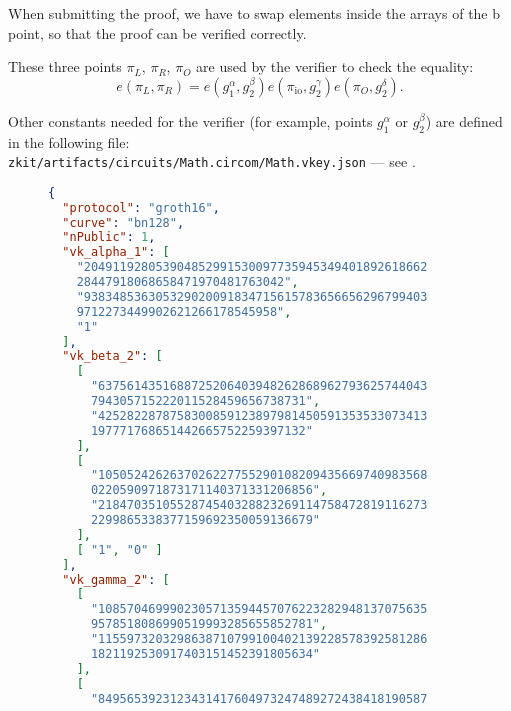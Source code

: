 \documentclass[../lecture-notes.tex]{subfiles}
\begin{document}
    \begin{remark}
        When submitting the proof, we have to swap elements inside the arrays of the b point, so that the proof can be verified correctly.
    \end{remark}

    These three points $\pi_L$, $\pi_R$, $\pi_O$ are used by the verifier to check the equality:
    \[
        e(\pi_L, \pi_R) = e(g_1^\alpha, g_2^\beta)e(\pi_{\text{io}},g_2^\gamma)e(\pi_O,g_2^\delta).
    \]

    Other constants needed for the verifier (for example, points $g_1^{\alpha}$ or $g_2^{\beta}$) are defined in the following file: \\
    \texttt{zkit/artifacts/circuits/Math.circom/Math.vkey.json} --- see .

    \begin{figure}
        \begin{center}
            \begin{tcolorbox}[enhanced,
                breakable,
                width=0.75\textwidth,
                title=\textbf{vkey.json},
                coltitle=gray!25!black,
                attach boxed title to top center={yshift=-2mm,yshifttext=-1mm},
                boxed title style={size=small,colframe=gray!75!black,
                colback=purple!30!white,boxrule=1pt},
                top=-0.35cm,
                bottom=-0.35cm]
                \begin{lstlisting}[language=JSON,numbers=none,basicstyle=\footnotesize\ttfamily\tiny]
{
  "protocol": "groth16",
  "curve": "bn128",
  "nPublic": 1,
  "vk_alpha_1": [
    "204911928053904852991530097735945349401892618662
    28447918068658471970481763042",
    "938348536305329020091834715615783656656296799403
    9712273449902621266178545958",
    "1"
  ],
  "vk_beta_2": [
    [
      "6375614351688725206403948262868962793625744043
      794305715222011528459656738731",
      "4252822878758300859123897981450591353533073413
      197771768651442665752259397132"
    ],
    [
      "1050524262637026227755290108209435669740983568
      0220590971873171140371331206856",
      "2184703510552874540328823269114758472819116273
      2299865338377159692350059136679"
    ],
    [ "1", "0" ]
  ],
  "vk_gamma_2": [
    [
      "1085704699902305713594457076223282948137075635
      9578518086990519993285655852781",
      "1155973203298638710799100402139228578392581286
      1821192530917403151452391805634"
    ],
    [
      "8495653923123431417604973247489272438418190587

\end{lstlisting}
\end{tcolorbox}
\end{center}
\end{figure}
\end{document}
